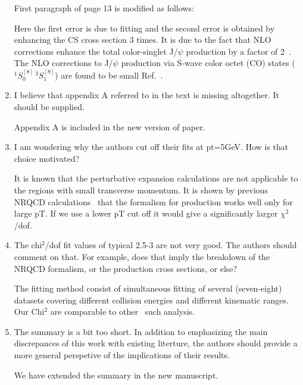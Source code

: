 \documentclass[aps,prc,preprint,superscriptaddress,showpacs,showkeys,amsmath]{revtex4-1}
\begin{document}
\begin{enumerate}
{  First paragraph of page 13 is modified as follows:
  
  Here the first error is due to fitting and the second error is 
  obtained by enhancing the CS cross section 3 times. 
  It is due to the fact that NLO corrections enhance the total color-singlet J/$\psi$ 
  production by a factor of 2~\cite{Gong:2008sn}.
  The NLO corrections to J/$\psi$ production via S-wave color octet (CO) states 
  ($^1S_{0}^{[8]}\,^3S_{1}^{[8]}$) are found to be small Ref.~\cite{Gong:2008ft}.
}



\item I believe that appendix A referred to in the text is missing altogether. It
should be supplied.

{\color{blue} Appendix A is included in the new version of paper. }


\item I am wondering why the authors cut off their fits at pt=5GeV. How is that
choice motivated?

{\color{blue} 
  It is known that the perturbative expansion calculations are not applicable to the regions 
with small transverse  momentum. It is shown by previous NRQCD calculations~\cite{Sharma:2012dy} that the 
formalism for production works well only for large pT. If we use a lower pT cut off 
it would give a significantly larger $\chi^2$/dof. 
}


\item The chi$^2$/dof fit values of typical 2.5-3 are not very good. The authors
should comment on that. For example, does that imply the breakdown of the 
NRQCD formalism, or the production cross sections, or else?

{\color{blue} 
  The fitting method consist of simultaneous fitting of several (seven-eight) datasets
  covering different collision energies and different kinematic ranges. Our Chi$^{2}$
  are comparable to other~\cite{Sharma:2012dy,Butenschoen:2012qr} such analysis. 
}

\item The summary is a bit too short. In addition to emphasizing the main
discrepances of this work with existing literture, the authors should 
provide a more general perspetive of the implications of their
results.

{\color{blue} 
  We have extended the summary in the new manuscript.
  
}
\end{enumerate}
\end{document}
